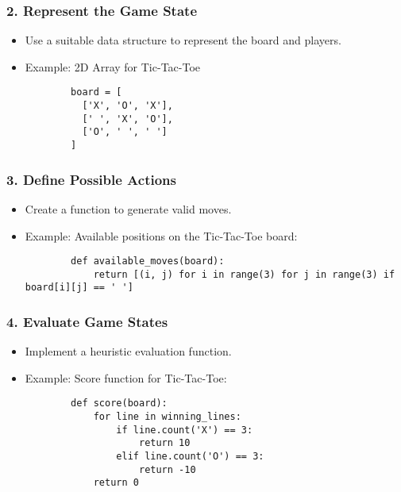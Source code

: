 \documentclass[aspectratio=169]{beamer}
\begin{document}
\begin{frame}[fragile]
    \frametitle{2. Represent the Game State}
    \begin{itemize}
        \item Use a suitable data structure to represent the board and players.
        \item Example: 2D Array for Tic-Tac-Toe
        \begin{lstlisting}
        board = [
          ['X', 'O', 'X'],
          [' ', 'X', 'O'],
          ['O', ' ', ' ']
        ]
        \end{lstlisting}
    \end{itemize}
\end{frame}

\begin{frame}[fragile]
    \frametitle{3. Define Possible Actions}
    \begin{itemize}
        \item Create a function to generate valid moves.
        \item Example: Available positions on the Tic-Tac-Toe board:
        \begin{lstlisting}
        def available_moves(board):
            return [(i, j) for i in range(3) for j in range(3) if board[i][j] == ' ']
        \end{lstlisting}
    \end{itemize}
\end{frame}

\begin{frame}[fragile]
    \frametitle{4. Evaluate Game States}
    \begin{itemize}
        \item Implement a heuristic evaluation function.
        \item Example: Score function for Tic-Tac-Toe:
        \begin{lstlisting}
        def score(board):
            for line in winning_lines:
                if line.count('X') == 3:
                    return 10
                elif line.count('O') == 3:
                    return -10
            return 0
        \end{lstlisting}
    \end{itemize}
\end{frame}
\end{document}
